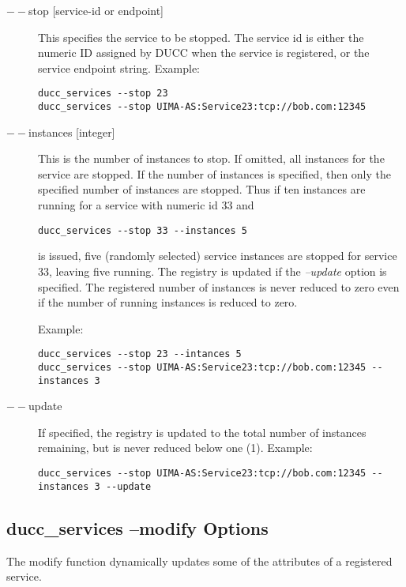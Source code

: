     \begin{description}

  \item[$--$stop {[service-id or endpoint]}] This specifies the service to be stopped. The service id
         is either the numeric ID assigned by DUCC when the service is registered, or the service
         endpoint string. Example:
\begin{verbatim}
ducc_services --stop 23 
ducc_services --stop UIMA-AS:Service23:tcp://bob.com:12345 
\end{verbatim}
         
       \item[$--$instances {[integer]}] This is the number of instances to stop. If omitted, all
         instances for the service are stopped.  If the number of instances is specified, then only
         the specified number of instances are stopped. Thus if ten instances are running for a
         service with numeric id 33 and
\begin{verbatim}
ducc_services --stop 33 --instances 5
\end{verbatim}
         is issued, five (randomly selected) service instances are stopped for
         service 33, leaving five running.  The registry is updated if the {\em --update} option is
         specified. The registered number of instances is never reduced to zero even if the number of
         running instances is reduced to zero.

         Example: 
\begin{verbatim}
ducc_services --stop 23 --intances 5 
ducc_services --stop UIMA-AS:Service23:tcp://bob.com:12345 --instances 3  
\end{verbatim}

       \item[$--$update] If specified, the registry is updated to the total number of instances
         remaining, but is never reduced below one (1). Example: 
\begin{verbatim}
ducc_services --stop UIMA-AS:Service23:tcp://bob.com:12345 --instances 3 --update
\end{verbatim}

    \end{description}

    \subsection{ducc\_services --modify Options}
    The modify function dynamically updates some of the attributes of a registered service. 
    
